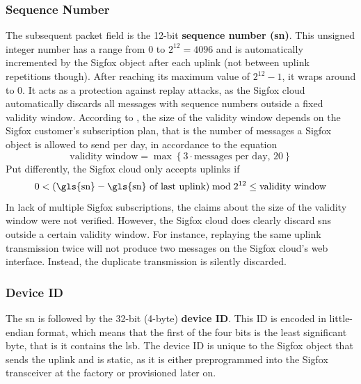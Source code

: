 \subsubsection{Sequence Number}
The subsequent packet field is the 12-bit \textbf{sequence number (\gls{sn})}.
This unsigned integer number has a range from 0 to $2^{12} = 4096$ and is automatically incremented by the Sigfox object after each uplink (not between uplink repetitions though).
After reaching its maximum value of $2^{12} - 1$, it wraps around to $0$.
It acts as a protection against replay attacks, as the Sigfox cloud automatically discards all messages with sequence numbers outside a fixed validity window.
According to \cite[Section 5.1.1]{sigfox_tech}, the size of the validity window depends on the Sigfox customer's subscription plan, that is the number of messages a Sigfox object is allowed to send per day, in accordance to the equation
\begin{equation}
	\text{validity window} = \max  \left \{ 3 \cdot \text{messages per day}, \, 20 \right \}
\end{equation}
Put differently, the Sigfox cloud only accepts uplinks if
\begin{equation}
	0 < \left(\text{\gls{sn}} - \text{\gls{sn} of last uplink} \right) \bmod 2^{12} \leq \text{validity window}
\end{equation}
In lack of multiple Sigfox subscriptions, the claims about the size of the validity window were not verified.
However, the Sigfox cloud does clearly discard \glspl{sn} outside a certain validity window.
For instance, replaying the same uplink transmission twice will not produce two messages on the Sigfox cloud's web interface.
Instead, the duplicate transmission is silently discarded.

\subsubsection{Device ID}
The \gls{sn} is followed by the 32-bit (4-byte) \textbf{device ID}.
This ID is encoded in little-endian format, which means that the first of the four bits is the least significant byte, that is it contains the \gls{lsb}.
The device ID is unique to the Sigfox object that sends the uplink and is static, as it is either preprogrammed into the Sigfox transceiver at the factory or provisioned later on.

